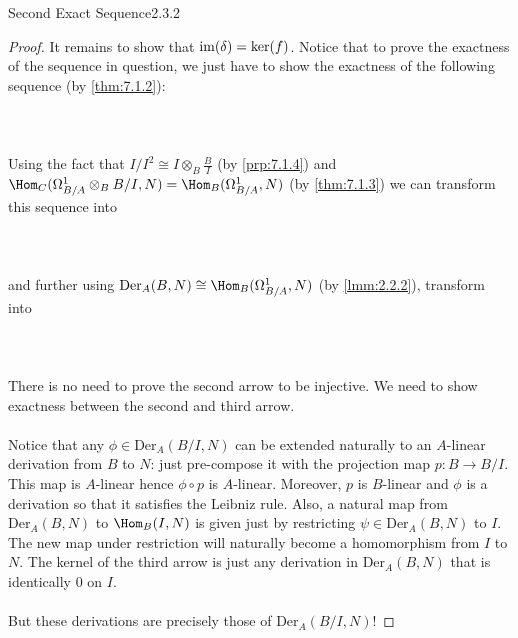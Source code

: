 \documentclass[a4paper]{article}
\begin{document}
\begin{thm}{Second Exact Sequence}{2.3.2}
\begin{proof}
It remains to show that $\operatorname{im}(\delta)=\ker(f)$. Notice that to prove the exactness of the sequence in question, we just have to show the exactness of the following sequence (by \ref{thm:7.1.2}): \\~\\
\\~\\
Using the fact that $I/I^2\cong I\otimes_B\frac{B}{I}$ (by \ref{prp:7.1.4}) and $\Hom_C(\Omega_{B/A}^1\otimes_BB/I,N)=\Hom_B(\Omega_{B/A}^1,N)$ (by \ref{thm:7.1.3}) we can transform this sequence into \\~\\
\\~\\
and further using $\text{Der}_A(B,N)\cong\Hom_B(\Omega_{B/A}^1,N)$ (by \ref{lmm:2.2.2}), transform into \\~\\
\\~\\
There is no need to prove the second arrow to be injective. We need to show exactness between the second and third arrow. \\~\\

Notice that any $\phi\in\text{Der}_A(B/I,N)$ can be extended naturally to an $A$-linear derivation from $B$ to $N$: just pre-compose it with the projection map $p:B\to B/I$. This map is $A$-linear hence $\phi\circ p$ is $A$-linear. Moreover, $p$ is $B$-linear and $\phi$ is a derivation so that it satisfies the Leibniz rule. Also, a natural map from $\text{Der}_A(B,N)$ to $\Hom_B(I,N)$ is given just by restricting $\psi\in\text{Der}_A(B,N)$ to $I$. The new map under restriction will naturally become a homomorphism from $I$ to $N$. The kernel of the third arrow is just any derivation in $\text{Der}_A(B,N)$ that is identically $0$ on $I$. \\~\\
But these derivations are precisely those of $\text{Der}_A(B/I,N)$! 
\end{proof}
\end{thm}
\end{document}
